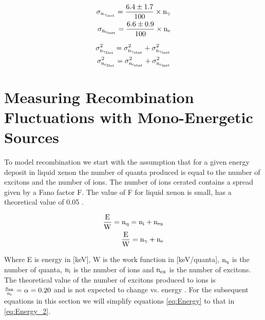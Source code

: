 \begin{equation}
\begin{split}
\rm  \sigma_{n_{\gamma_{inst}}} = \frac{6.4\pm 1.7}{100} \times n_\gamma\\
\rm  \sigma_{n_{e_{inst}}} = \frac{6.6\pm 0.9}{100} \times n_e
\label{eq:SigInst}
\end{split}
\end{equation}

\begin{equation}
\begin{split}
\rm  \sigma_{n_{\gamma_{Det}}}^2 = \sigma_{n_{\gamma_{stat}}}^2 + \sigma_{n_{\gamma_{inst}}}^2 \\
\rm \sigma_{n_{e_{Det}}}^2 = \sigma_{n_{e_{stat}}}^2 + \sigma_{n_{e_{inst}}}^2
\label{eq:SigDet}
\end{split}
\end{equation}


\section{Measuring Recombination Fluctuations with Mono-Energetic Sources}
\label{sec:flucs_mono}

To model recombination we start with the assumption that for a given energy deposit in liquid xenon the number of quanta produced is equal to the number of excitons and the number of ions. The number of ions cerated contains a spread given by a Fano factor F. The value of F for liquid xenon is small, has a theoretical value of 0.05 \cite{FanoTheoretical}.

\begin{equation}
\begin{split}
\rm  \frac{E}{W} = n_q = n_i + n_{ex}\\
\rm \frac{E}{W} = n_\gamma + n_e
\label{eq:Energy}
\end{split}
\end{equation}

Where E is energy in [keV], W is the work function in [keV/quanta], $\rm n_{q}$ is the number of quanta, $\rm n_{i}$ is the number of ions and $\rm n_{ex}$ is the number of excitons. The theoretical value of the number of excitons produced to ions is $\rm \frac{n_{ex}}{n_{i}}= \alpha = 0.20$ \cite{Doke_alpha} and is not expected to change vs. energy \cite{alpha_argon} \cite{alpha_xenon} \cite{Dahl_Thesis}. For the subsequent equations in this section we will simplify equations \ref{eq:Energy} to that in \ref{eq:Energy_2}.


